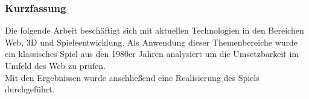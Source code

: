 \subsubsection{Kurzfassung}

Die folgende Arbeit beschäftigt sich mit aktuellen Technologien in den Bereichen Web, 3D und Spieleentwicklung. Als Anwendung dieser Themenbereiche wurde ein klassisches Spiel aus den 1980er Jahren analysiert um die Umsetzbarkeit im Umfeld des Web zu prüfen.\\
Mit den Ergebnissen wurde anschließend eine Realisierung des Spiels durchgeführt.
